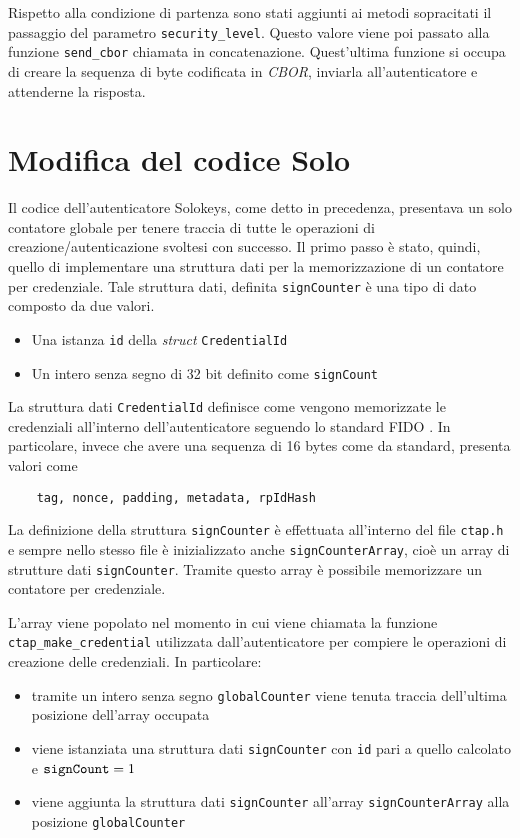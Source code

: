 Rispetto alla condizione di partenza sono stati aggiunti ai metodi sopracitati il passaggio del parametro \verb*|security_level|. Questo valore viene poi passato alla funzione \verb*|send_cbor| chiamata in concatenazione. Quest'ultima funzione si occupa di creare la sequenza di byte codificata in \emph{CBOR}, inviarla all'autenticatore e attenderne la risposta. 

\section{Modifica del codice Solo}
\label{modifica_solo}

Il codice dell'autenticatore Solokeys, come detto in precedenza, presentava un solo contatore globale per tenere traccia di tutte le operazioni di creazione/autenticazione svoltesi con successo. Il primo passo è stato, quindi, quello di implementare una struttura dati per la memorizzazione di un contatore per credenziale. Tale struttura dati, definita \verb*|signCounter| è una tipo di dato composto da due valori.
\begin{itemize}
	\item Una istanza \verb*|id| della \emph{struct} \verb*|CredentialId|
	\item Un intero senza segno di 32 bit definito come \verb*|signCount|
\end{itemize}

La struttura dati \verb*|CredentialId| definisce come vengono memorizzate le credenziali all'interno dell'autenticatore seguendo lo standard FIDO \cite{fido:credential_id}. In particolare, invece che avere una sequenza di 16 bytes come da standard, presenta valori come \begin{verbatim}
	tag, nonce, padding, metadata, rpIdHash
\end{verbatim} 

La definizione della struttura \verb*|signCounter| è effettuata all'interno del file \verb*|ctap.h| e sempre nello stesso file è inizializzato anche \verb*|signCounterArray|, cioè un array di strutture dati \verb*|signCounter|. Tramite questo array è possibile memorizzare un contatore per credenziale. 

L'array viene popolato nel momento in cui viene chiamata la funzione \verb*|ctap_make_credential| utilizzata dall'autenticatore per compiere le operazioni di creazione delle credenziali. In particolare:
\begin{itemize}
	\item tramite un intero senza segno \verb*|globalCounter| viene tenuta traccia dell'ultima posizione dell'array occupata
	\item viene istanziata una struttura dati \verb*|signCounter| con \verb*|id| pari a quello calcolato e $\verb*|signCount| = 1 $
	\item viene aggiunta la struttura dati \verb*|signCounter| all'array \verb*|signCounterArray| alla posizione \verb*|globalCounter|
\end{itemize}

